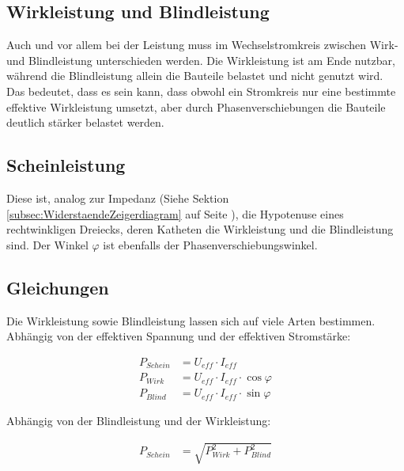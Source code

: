 

\subsection{Wirkleistung und Blindleistung}

Auch und vor allem bei der Leistung muss im Wechselstromkreis zwischen Wirk- und Blindleistung unterschieden werden. Die Wirkleistung ist am Ende nutzbar, während die Blindleistung allein die Bauteile belastet und nicht genutzt wird. Das bedeutet, dass es sein kann, dass obwohl ein Stromkreis nur eine bestimmte effektive Wirkleistung umsetzt, aber durch Phasenverschiebungen die Bauteile deutlich stärker belastet werden.


\subsection{Scheinleistung}

Diese ist, analog zur Impedanz (Siehe Sektion \ref{subsec:WiderstaendeZeigerdiagram} auf Seite \pageref{subsec:WiderstaendeZeigerdiagram}), die Hypotenuse eines rechtwinkligen Dreiecks, deren Katheten die Wirkleistung und die Blindleistung sind. Der Winkel $\varphi$ ist ebenfalls der Phasenverschiebungswinkel.


\subsection{Gleichungen}

Die Wirkleistung sowie Blindleistung lassen sich auf viele Arten bestimmen. \\
\vspace{11pt}
Abhängig von der effektiven Spannung und der effektiven Stromstärke:

\begin{align}		\label{eq:ScheinleistungUI}
	P_{Schein} &= U_{eff} \cdot I_{eff}						\\
	P_{Wirk}   &= U_{eff} \cdot I_{eff} \cdot \cos \varphi	\\
	P_{Blind}  &= U_{eff} \cdot I_{eff} \cdot \sin \varphi	
\end{align}

Abhängig von der Blindleistung und der Wirkleistung:

\begin{align}		\label{eq:ScheinleistungPP}
	P_{Schein}  &= \sqrt{P_{Wirk}^2 + P_{Blind}^2}
\end{align}




